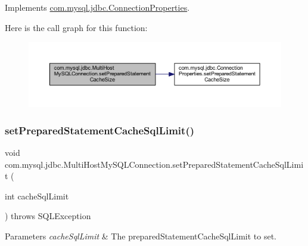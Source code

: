 Implements \mbox{\hyperlink{interfacecom_1_1mysql_1_1jdbc_1_1_connection_properties_ad65dad2e98f66f1b4a8d1aff24cbc2d5}{com.\+mysql.\+jdbc.\+Connection\+Properties}}.

Here is the call graph for this function\+:
\nopagebreak
\begin{figure}[H]
\begin{center}
\leavevmode
\includegraphics[width=350pt]{classcom_1_1mysql_1_1jdbc_1_1_multi_host_my_s_q_l_connection_a05873fd9b3404787c16dd6ae3793d84e_cgraph}
\end{center}
\end{figure}
\mbox{\label{classcom_1_1mysql_1_1jdbc_1_1_multi_host_my_s_q_l_connection_aeab0c45eb21ae847d8275f48c9bf045b}} 
\subsubsection{\texorpdfstring{set\+Prepared\+Statement\+Cache\+Sql\+Limit()}{setPreparedStatementCacheSqlLimit()}}
{\footnotesize\ttfamily void com.\+mysql.\+jdbc.\+Multi\+Host\+My\+S\+Q\+L\+Connection.\+set\+Prepared\+Statement\+Cache\+Sql\+Limit (\begin{DoxyParamCaption}\item[{int}]{cache\+Sql\+Limit }\end{DoxyParamCaption}) throws S\+Q\+L\+Exception}


\begin{DoxyParams}{Parameters}
{\em cache\+Sql\+Limit} & The prepared\+Statement\+Cache\+Sql\+Limit to set. \\
\hline
\end{DoxyParams}


